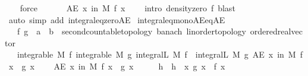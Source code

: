 \begin{isabellebody}
\ {\isacharasterisk}{\kern0pt}\ \isamarkupfalse%
\ force\isanewline
\ \ \isacommand{{\isacharbraceright}{\kern0pt}}\isamarkupfalse%
\isanewline
\ \ \isamarkupfalse%
\ {\isachardoublequoteopen}AE\ x\ in\ M{\isachardot}{\kern0pt}\ f\ x\ {\isacharequal}{\kern0pt}\ {}{\isachardoublequoteclose}\ \isamarkupfalse%
\ {\isacharparenleft}{\kern0pt}intro\ density{\isacharunderscore}{\kern0pt}zero\ f{\isacharcomma}{\kern0pt}\ blast{\isacharparenright}{\kern0pt}\isanewline
{}\isamarkupfalse%
\ {\isacharparenleft}{\kern0pt}auto\ simp\ add{\isacharcolon}{\kern0pt}\ integral{\isacharunderscore}{\kern0pt}eq{\isacharunderscore}{\kern0pt}zero{\isacharunderscore}{\kern0pt}AE{\isacharparenright}{\kern0pt}%
\endisatagproof
{\isafoldproof}%
%
\isadelimproof
\isanewline
%
\endisadelimproof
\isanewline
{}\isamarkupfalse%
\ integral{\isacharunderscore}{\kern0pt}eq{\isacharunderscore}{\kern0pt}mono{\isacharunderscore}{\kern0pt}AE{\isacharunderscore}{\kern0pt}eq{\isacharunderscore}{\kern0pt}AE{\isacharcolon}{\kern0pt}\isanewline
\ \ \ f\ g\ {\isacharcolon}{\kern0pt}{\isacharcolon}{\kern0pt}\ {\isachardoublequoteopen}{\isacharprime}{\kern0pt}a\ {\isasymRightarrow}\ {\isacharprime}{\kern0pt}b\ {\isacharcolon}{\kern0pt}{\isacharcolon}{\kern0pt}\ {\isacharbraceleft}{\kern0pt}second{\isacharunderscore}{\kern0pt}countable{\isacharunderscore}{\kern0pt}topology{\isacharcomma}{\kern0pt}\ banach{\isacharcomma}{\kern0pt}\ linorder{\isacharunderscore}{\kern0pt}topology{\isacharcomma}{\kern0pt}\ ordered{\isacharunderscore}{\kern0pt}real{\isacharunderscore}{\kern0pt}vector{\isacharbraceright}{\kern0pt}{\isachardoublequoteclose}\isanewline
\ \ \ {\isachardoublequoteopen}integrable\ M\ f{\isachardoublequoteclose}\ {\isachardoublequoteopen}integrable\ M\ g{\isachardoublequoteclose}\ {\isachardoublequoteopen}integral\isactrlsup L\ M\ f\ {\isacharequal}{\kern0pt}\ integral\isactrlsup L\ M\ g{\isachardoublequoteclose}\ {\isachardoublequoteopen}AE\ x\ in\ M{\isachardot}{\kern0pt}\ f\ x\ {\isasymle}\ g\ x{\isachardoublequoteclose}\ \isanewline
\ \ \ {\isachardoublequoteopen}AE\ x\ in\ M{\isachardot}{\kern0pt}\ f\ x\ {\isacharequal}{\kern0pt}\ g\ x{\isachardoublequoteclose}\isanewline
%
\isadelimproof
%
\endisadelimproof
%
\isatagproof
{}\isamarkupfalse%
\ {\isacharminus}{\kern0pt}\isanewline
\ \ \isamarkupfalse%
\ h\ \ {\isachardoublequoteopen}h\ {\isacharequal}{\kern0pt}\ {\isacharparenleft}{\kern0pt}{\isasymlambda}x{\isachardot}{\kern0pt}\ g\ x\ {\isacharminus}{\kern0pt}\ f\ x{\isacharparenright}{\kern0pt}{\isachardoublequoteclose}\isanewline

\end{isabellebody}
